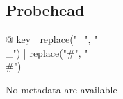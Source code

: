 \begin{multicols}{2}
\subsection{Probehead}

\begin{description}
\item[{@ key | replace("_", "\\_") | replace("#", "\\#") }] %
\end{description}
No metadata are available

\end{multicols}